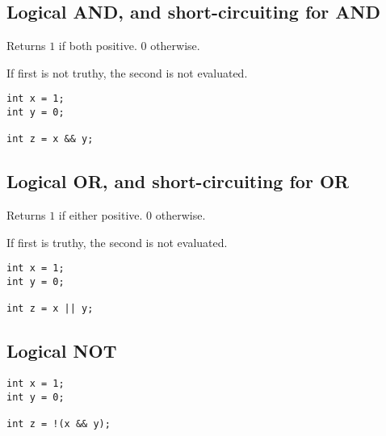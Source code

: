 
\subsection{Logical AND, and short-circuiting for AND}

Returns \(1\) if both positive. \(0\) otherwise.

If first is not truthy, the second is not evaluated.

\begin{verbatim}
int x = 1;
int y = 0;

int z = x && y;

\end{verbatim}

\subsection{Logical OR, and short-circuiting for OR}

Returns \(1\) if either positive. \(0\) otherwise.

If first is truthy, the second is not evaluated.

\begin{verbatim}
int x = 1;
int y = 0;

int z = x || y;

\end{verbatim}

\subsection{Logical NOT}

\begin{verbatim}
int x = 1;
int y = 0;

int z = !(x && y);

\end{verbatim}

